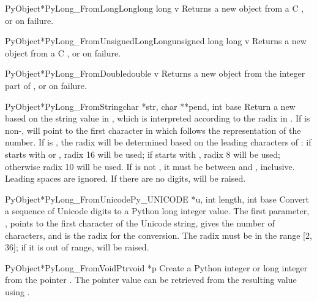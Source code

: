 \begin{cfuncdesc}{PyObject*}{PyLong_FromLongLong}{long long v}
  Returns a new  object from a C ,
  or \NULL{} on failure.
\end{cfuncdesc}

\begin{cfuncdesc}{PyObject*}{PyLong_FromUnsignedLongLong}{unsigned long long v}
  Returns a new  object from a C , or \NULL{} on failure.
\end{cfuncdesc}

\begin{cfuncdesc}{PyObject*}{PyLong_FromDouble}{double v}
  Returns a new  object from the integer part of
  , or \NULL{} on failure.
\end{cfuncdesc}

\begin{cfuncdesc}{PyObject*}{PyLong_FromString}{char *str, char **pend,
                                                int base}
  Return a new  based on the string value in
  , which is interpreted according to the radix in
  .  If  is non-\NULL{},  will
  point to the first character in  which follows the
  representation of the number.  If  is , the radix
  will be determined based on the leading characters of : if
   starts with  or , radix 16 will be
  used; if  starts with , radix 8 will be used;
  otherwise radix 10 will be used.  If  is not , it
  must be between  and , inclusive.  Leading spaces
  are ignored.  If there are no digits,  will be
  raised.
\end{cfuncdesc}

\begin{cfuncdesc}{PyObject*}{PyLong_FromUnicode}{Py_UNICODE *u,
                                                 int length, int base}
  Convert a sequence of Unicode digits to a Python long integer
  value.  The first parameter, , points to the first character
  of the Unicode string,  gives the number of characters,
  and  is the radix for the conversion.  The radix must be
  in the range [2, 36]; if it is out of range, 
  will be raised.
\end{cfuncdesc}

\begin{cfuncdesc}{PyObject*}{PyLong_FromVoidPtr}{void *p}
  Create a Python integer or long integer from the pointer .
  The pointer value can be retrieved from the resulting value using
  .
\end{cfuncdesc}

